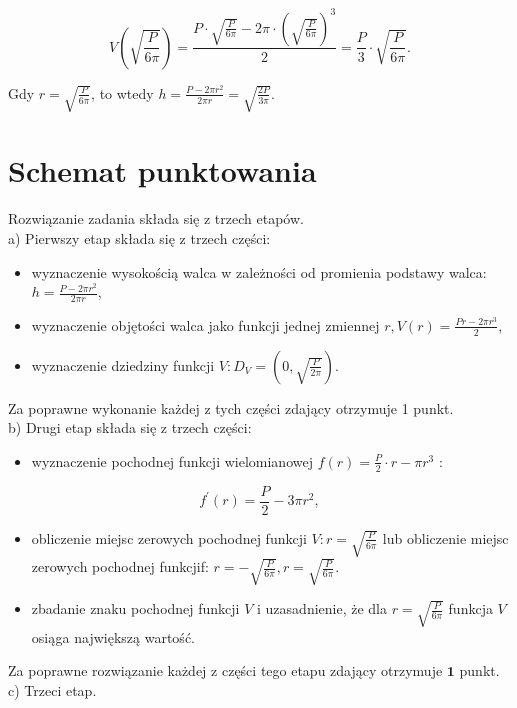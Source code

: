 \documentclass[10pt]{article}
\begin{document}
$$
V\left(\sqrt{\frac{P}{6 \pi}}\right)=\frac{P \cdot \sqrt{\frac{P}{6 \pi}}-2 \pi \cdot\left(\sqrt{\frac{P}{6 \pi}}\right)^{3}}{2}=\frac{P}{3} \cdot \sqrt{\frac{P}{6 \pi}} .
$$

Gdy $r=\sqrt{\frac{P}{6 \pi}}$, to wtedy $h=\frac{P-2 \pi r^{2}}{2 \pi r}=\sqrt{\frac{2 P}{3 \pi}}$.

\section*{Schemat punktowania}
Rozwiązanie zadania składa się z trzech etapów.\\
a) Pierwszy etap składa się z trzech części:

\begin{itemize}
  \item wyznaczenie wysokością walca w zależności od promienia podstawy walca: $h=\frac{P-2 \pi r^{2}}{2 \pi r}$,
  \item wyznaczenie objętości walca jako funkcji jednej zmiennej $r, V(r)=\frac{P r-2 \pi r^{3}}{2}$,
  \item wyznaczenie dziedziny funkcji $V: D_{V}=\left(0, \sqrt{\frac{P}{2 \pi}}\right)$.
\end{itemize}

Za poprawne wykonanie każdej z tych części zdający otrzymuje 1 punkt.\\
b) Drugi etap składa się z trzech części:

\begin{itemize}
  \item wyznaczenie pochodnej funkcji wielomianowej $f(r)=\frac{P}{2} \cdot r-\pi r^{3}$ :
\end{itemize}

$$
f^{\prime}(r)=\frac{P}{2}-3 \pi r^{2},
$$

\begin{itemize}
  \item obliczenie miejsc zerowych pochodnej funkcji $V: r=\sqrt{\frac{P}{6 \pi}}$ lub obliczenie miejsc zerowych pochodnej funkcjif: $r=-\sqrt{\frac{P}{6 \pi}}, r=\sqrt{\frac{P}{6 \pi}}$.
  \item zbadanie znaku pochodnej funkcji $V$ i uzasadnienie, że dla $r=\sqrt{\frac{P}{6 \pi}}$ funkcja $V$ osiąga największą wartość.
\end{itemize}

Za poprawne rozwiązanie każdej z części tego etapu zdający otrzymuje $\mathbf{1}$ punkt.\\
c) Trzeci etap.
\end{document}
